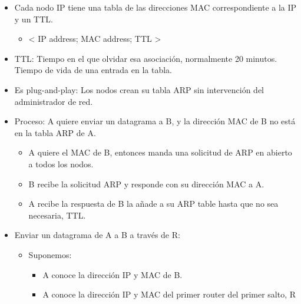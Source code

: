 \documentclass[12pt, twoside, openright]{report} %
\begin{document}
\begin{itemize}
	      \begin{itemize}
		      \item Cada nodo IP tiene una tabla de las direcciones MAC
		            correspondiente a la IP y un TTL.
		            \begin{itemize}
			            \item \textless{} IP address; MAC address; TTL \textgreater{}
		            \end{itemize}
		      \item TTL: Tiempo en el que olvidar esa asociación, normalmente 20 minutos.
		            Tiempo de vida de una entrada en la tabla.
		      \item Es plug-and-play: Los nodos crean su tabla ARP sin intervención del administrador de red.
		      \item Proceso: A quiere enviar un datagrama a B, y la dirección MAC de B no está en la tabla ARP de A.
		            \begin{itemize}
			            \item A quiere el MAC de B, entonces manda una solicitud de ARP en abierto a todos los nodos.
			            \item B recibe la solicitud ARP y responde con su dirección MAC a A.
			            \item A recibe la respuesta de B la añade a su ARP table hasta que no sea necesaria, TTL.
		            \end{itemize}
		            \pagebreak
		      \item Enviar un datagrama de A a B a través de R:
		            \begin{itemize}
			            \item Suponemos:
			                  \begin{itemize}
				                  \item A conoce la dirección IP y MAC de B.
				                  \item A conoce la dirección IP y MAC del primer router del primer salto, R
			                  \end{itemize}


\end{itemize}
\end{itemize}
\end{itemize}
\end{document}
